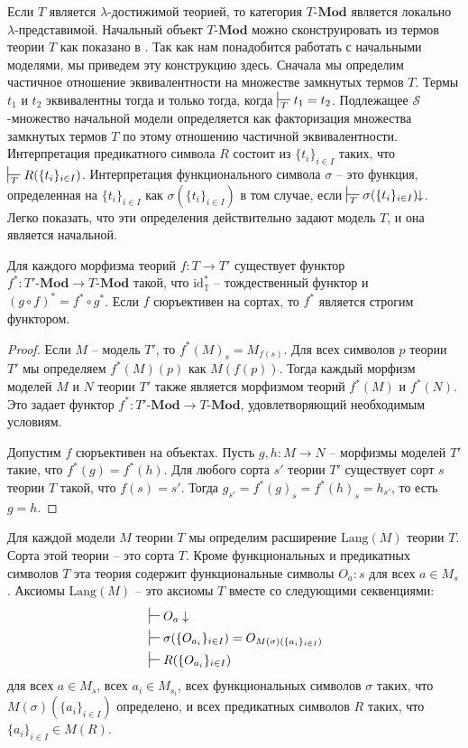 \documentclass[reqno]{amsart}
\theoremstyle{definition}
\theoremstyle{remark}
\newcommand{\bcat}[1]{\mathbf{#1}}
\newcommand{\Mod}[1]{#1\text{-}\bcat{Mod}}
\newcommand{\fs}[1]{\mathrm{#1}}
\newcommand{\Lang}{\fs{Lang}}
\begin{document}
Если $T$ является $\lambda$-достижимой теорией, то категория $\Mod{T}$ является локально $\lambda$-представимой.
Начальный объект $\Mod{T}$ можно сконструировать из термов теории $T$ как показано в \cite[Theorem~22]{PHL}.
Так как нам понадобится работать с начальными моделями, мы приведем эту конструкцию здесь.
Сначала мы определим частичное отношение эквивалентности на множестве замкнутых термов $T$.
Термы $t_1$ и $t_2$ эквивалентны тогда и только тогда, когда $\sststile{T}{} t_1 = t_2$.
Подлежащее $\mathcal{S}$-множество начальной модели определяется как факторизация множества замкнутых термов $T$ по этому отношению частичной эквивалентности.
Интерпретация предикатного символа $R$ состоит из $\{ t_i \}_{i \in I}$ таких, что $\sststile{T}{} R(\{ t_i \}_{i \in I})$.
Интерпретация функционального символа $\sigma$ -- это функция, определенная на $\{ t_i \}_{i \in I}$ как $\sigma(\{ t_i \}_{i \in I})$ в том случае, если $\sststile{T}{} \sigma(\{ t_i \}_{i \in I})\!\!\downarrow$.
Легко показать, что эти определения действительно задают модель $T$, и она является начальной.

\begin{prop}
Для каждого морфизма теорий $f : T \to T'$ существует функтор $f^* : \Mod{T'} \to \Mod{T}$ такой, что $\fs{id}_\mathbb{T}^*$ -- тождественный функтор и $(g \circ f)^* = f^* \circ g^*$.
Если $f$ сюръективен на сортах, то $f^*$ является строгим функтором.
\end{prop}
\begin{proof}
Если $M$ -- модель $T'$, то $f^*(M)_s = M_{f(s)}$.
Для всех символов $p$ теории $T'$ мы определяем $f^*(M)(p)$ как $M(f(p))$.
Тогда каждый морфизм моделей $M$ и $N$ теории $T'$ также является морфизмом теорий $f^*(M)$ и $f^*(N)$.
Это задает функтор $f^* : \Mod{T'} \to \Mod{T}$, удовлетворяющий необходимым условиям.

Допустим $f$ сюръективен на объектах.
Пусть $g,h : M \to N$ -- морфизмы моделей $T'$ такие, что $f^*(g) = f^*(h)$.
Для любого сорта $s'$ теории $T'$ существует сорт $s$ теории $T$ такой, что $f(s) = s'$.
Тогда $g_{s'} = f^*(g)_s = f^*(h)_s = h_{s'}$, то есть $g = h$.
\end{proof}

Для каждой модели $M$ теории $T$ мы определим расширение $\Lang(M)$ теории $T$.
Сорта этой теории -- это сорта $T$.
Кроме функциональных и предикатных символов $T$ эта теория содержит функциональные символы $O_a : s$ для всех $a \in M_s$.
Аксиомы $\Lang(M)$ -- это аксиомы $T$ вместе со следующими секвенциями:
\begin{align*}
& \sststile{}{} O_a \downarrow \\
& \sststile{}{} \sigma(\{ O_{a_i} \}_{i \in I}) = O_{M(\sigma)(\{ a_i \}_{i \in I})} \\
& \sststile{}{} R(\{ O_{a_i} \}_{i \in I})
\end{align*}
для всех $a \in M_s$, всех $a_i \in M_{s_i}$,
всех функциональных символов $\sigma$ таких, что $M(\sigma)(\{ a_i \}_{i \in I})$ определено,
и всех предикатных символов $R$ таких, что $\{ a_i \}_{i \in I} \in M(R)$.
\end{document}
